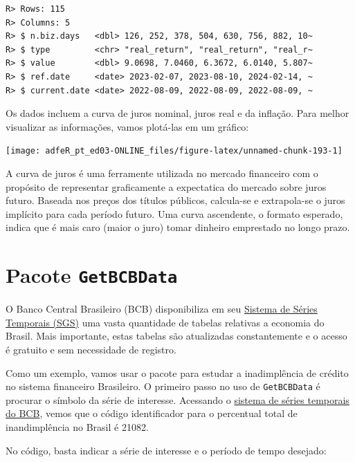 \documentclass[
  11pt,
]{book}
\begin{document}
\begin{verbatim}
R> Rows: 115
R> Columns: 5
R> $ n.biz.days   <dbl> 126, 252, 378, 504, 630, 756, 882, 10~
R> $ type         <chr> "real_return", "real_return", "real_r~
R> $ value        <dbl> 9.0698, 7.0460, 6.3672, 6.0140, 5.807~
R> $ ref.date     <date> 2023-02-07, 2023-08-10, 2024-02-14, ~
R> $ current.date <date> 2022-08-09, 2022-08-09, 2022-08-09, ~
\end{verbatim}

Os dados incluem a curva de juros nominal, juros real e da inflação. Para melhor visualizar as informações, vamos plotá-las em um gráfico:

\begin{center}\texttt{[image: adfeR\_pt\_ed03-ONLINE\_files/figure-latex/unnamed-chunk-193-1]} \end{center}

A curva de juros é uma ferramente utilizada no mercado financeiro com o propósito de representar graficamente a expectatica do mercado sobre juros futuro. Baseada nos preços dos títulos públicos, calcula-se e extrapola-se o juros implícito para cada período futuro. Uma curva ascendente, o formato esperado, indica que é mais caro (maior o juro) tomar dinheiro emprestado no longo prazo.

\hypertarget{pacote-getbcbdata}{%
\section{\texorpdfstring{Pacote \texttt{GetBCBData}}{Pacote GetBCBData}}\label{pacote-getbcbdata}}

O Banco Central Brasileiro (BCB) disponibiliza em seu \href{https://www3.bcb.gov.br/sgspub/localizarseries/localizarSeries.do?method=prepararTelaLocalizarSeries}{Sistema de Séries Temporais (SGS)} uma vasta quantidade de tabelas relativas a economia do Brasil. Mais importante, estas tabelas são atualizadas constantemente e o acesso é gratuito e sem necessidade de registro.

Como um exemplo, vamos usar o pacote para estudar a inadimplência de crédito no sistema financeiro Brasileiro. O primeiro passo no uso de \texttt{GetBCBData} é procurar o símbolo da série de interesse. Acessando o \href{https://www3.bcb.gov.br/sgspub/localizarseries/localizarSeries.do?method=prepararTelaLocalizarSeries}{sistema de séries temporais do BCB}, vemos que o código identificador para o percentual total de inandimplência no Brasil é 21082.

No código, basta indicar a série de interesse e o período de tempo desejado:
\end{document}
